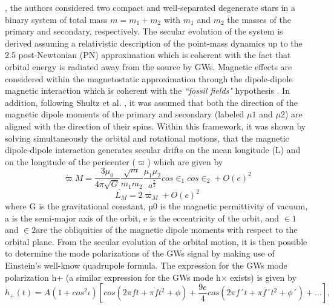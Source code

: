 \documentclass[a4paper,10.5pt]{article}
\begin{document}
, the authors considered two compact and well-separated degenerate stars in a binary system of total mass $m=m_1+m_2$ with $m_1$ and $m_2$ the masses of the primary and secondary, respectively. The secular evolution of the system is derived assuming a relativistic description of the point-mass dynamics up to the 2.5 post-Newtonian (PN) approximation  which is coherent with the fact that orbital energy is radiated away from the source by GWs. Magnetic effects are considered within the magnetostatic approximation through the dipole-dipole magnetic interaction which is coherent with the {\textit{``fossil fields"}} hypothesis . In addition, following Shultz et al. , it was assumed that both the direction of the magnetic dipole moments of the primary and secondary (labeled $\mu1$ and $\mu2$) are aligned with the direction of their spins. Within this framework, it was shown by solving simultaneously the orbital and rotational motions, that the magnetic dipole-dipole interaction generates secular drifts on the mean longitude (L) and on the longitude of the pericenter ($\varpi$) which are given by 
\begin{equation} \tag{2.1}
    \dot{\varpi} M=\frac{3\mu_0}{4\pi \sqrt{G}}\frac{\sqrt{m}}{m_1m_2} \frac{\mu_1 \mu_2 }{a^{\frac{7}{2}}} cos\in_1cos\in_2+O(e)^{2}
\end{equation}
\begin{equation}\tag{2.2}
    \dot{L_M}= 2\dot{\varpi_M}+O(e)^{2}
\end{equation}
where G is the gravitational constant, µ0 is the magnetic permittivity of vacuum, a is the semi-major axis of the orbit, e is the eccentricity of the orbit, and $\in1$ and $\in2$are the obliquities of the magnetic dipole moments with respect to the orbital plane. From the secular evolution of the orbital motion, it is then possible to determine the mode polarizations of the GWs signal by making use of Einstein’s well-know quadrupole formula. The expression for the GWs mode polarization h+ (a similar expression for the GWs mode h× exists) is given by
\begin{equation} \tag{2.3}
    h_+ (t) = A(1+cos^{2}\iota)[cos(2\pi ft+\pi\dot{f}t^{2}+ \phi)+\frac{9e}{4} cos (2\pi f´t+\pi\dot{f´}t^{2}+ \phi´)+ ...],
\end{equation}
\end{document}
